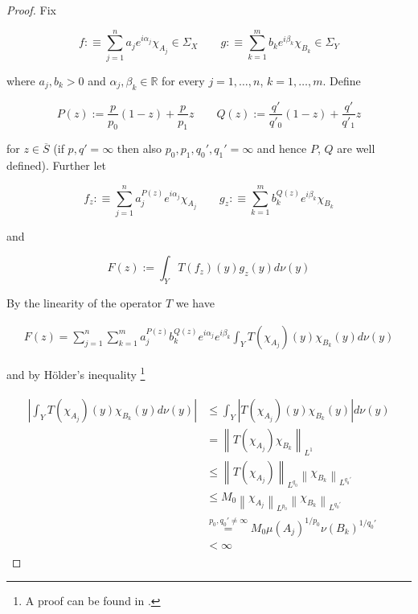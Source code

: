 \begin{proof}
Fix 
	
\begin{equation*}
	f :\equiv \sum_{j = 1}^n a_j e^{i\alpha_j}\chi_{A_j} \in \Sigma_X \qquad g :\equiv \sum_{k = 1}^m b_k e^{i\beta_k}\chi_{B_k} \in \Sigma_Y
\end{equation*}

	where $a_j, b_k > 0$ and $\alpha_j, \beta_k \in \mathbb{R}$ for every $j = 1,\hdots,n$, $k = 1,\hdots,m$. Define

\begin{equation*}
	P(z) := \frac{p}{p_0}(1 - z) + \frac{p}{p_1}z \qquad Q(z) := \frac{q'}{q'_0}(1 - z) + \frac{q'}{q'_1}z
\end{equation*}

	for $z \in \overline{S}$ (if $p,q' = \infty$ then also $p_0,p_1,q_0',q_1' = \infty $ and hence $P$, $Q$ are well defined). Further let
				
\begin{equation}
	f_z :\equiv \sum_{j = 1}^n a^{P(z)}_j e^{i\alpha_j}\chi_{A_j} \qquad g_z :\equiv  \sum_{k = 1}^m b^{Q(z)}_k e^{i\beta_k}\chi_{B_k}
	\label{def:fzgz}
\end{equation}
				
and 

\begin{equation}
	F(z) := \int_Y T(f_z)(y)g_z(y)d\nu(y)
\end{equation}

By the linearity of the operator $T$ we have

\begin{gather}
	F(z) = \sum_{j = 1}^n\sum_{k = 1}^m a^{P(z)}_j b_k^{Q(z)} e^{i\alpha_j} e^{i\beta_k} \int_YT(\chi_{A_j})(y)\chi_{B_k}(y)d\nu(y) 
	\label{def:F}
\end{gather}

and by H\"older's inequality \footnote{A proof can be found in \cite[223]{elstrodt:mass:2011}.}

\begin{gather}
	\begin{aligned}
		\left| \int_YT(\chi_{A_j})(y)\chi_{B_k}(y)d\nu(y) \right| &\leqslant \int_Y\left| T(\chi_{A_j})(y)\chi_{B_k}(y)\right|d\nu(y)\\
		&= \left\|T(\chi_{A_j})\chi_{B_k}\right\|_{L^1}\\
		&\leqslant \left\|T(\chi_{A_j})\right\|_{L^{q_0}} \left\|\chi_{B_k}\right\|_{L^{q_0'}}\\
		&\leqslant M_0\left\|\chi_{A_j}\right\|_{L^{p_0}} \left\|\chi_{B_k}\right\|_{L^{q_0'}}\\
		&\overset{p_0,q_0' \neq \infty}{=} M_0\mu\left(A_j\right)^{1/p_0} \nu\left(B_k\right)^{1/q_0'}\\ 
		&< \infty
	\end{aligned}
\end{gather}


\end{proof}
